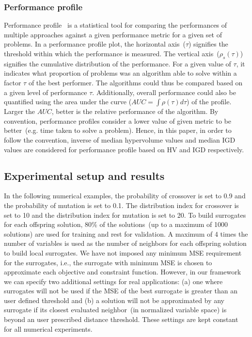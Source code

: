 \subsubsection{Performance profile} Performance profile~\cite{barbosa2010perf,dolan2002benchmarking} is a statistical tool for comparing the performances of multiple approaches against a given performance metric for a given set of problems. In a performance profile plot, the horizontal axis~($\tau$) signifies the threshold within which the performance is measured. The vertical axis~($\rho_{s}(\tau)$) signifies the cumulative distribution of the performance. For a given value of $\tau$, it indicates what proportion of problems was an algorithm able to solve within a factor $\tau$ of the best performer. The algorithms could thus be compared based on a given level of performance $\tau$. Additionally, overall performance could also be quantified using the area under the curve ($AUC = \int{\rho(\tau)d\tau}$)  of the profile. Larger the $AUC$, better is the relative performance of the algorithm. By convention, performance profiles consider a lower value of given metric to be better~(e.g. time taken to solve a problem). Hence, in this paper,  in order to follow the convention, inverse of median hypervolume values and median IGD values are considered for performance profile based on HV and IGD respectively.


\subsection{Experimental setup and results}

In the following numerical examples, the probability of crossover is set to 0.9 and the probability of mutation is set to 0.1. The distribution index for crossover is set to 10 and the distribution index for mutation is set to 20. To build surrogates for each offspring solution, 80\% of the solutions~(up to a maximum of 1000 solutions) are used for training and rest for validation. A maximum of 4 times the number of variables is used as the number of neighbors for each offspring solution to build local surrogates. We have not imposed any minimum MSE requirement for the surrogates, i.e., the surrogate with minimum MSE is chosen to approximate each objective and constraint function. However, in our framework we can specify two additional settings for real applications: (a) one where surrogates will not be used if the MSE of the best surrogate is greater than an user defined threshold and (b) a solution will not be approximated by any surrogate if its closest evaluated neighbor~(in normalized variable space) is beyond an user prescribed distance threshold. These settings are kept constant for all numerical experiments. 

